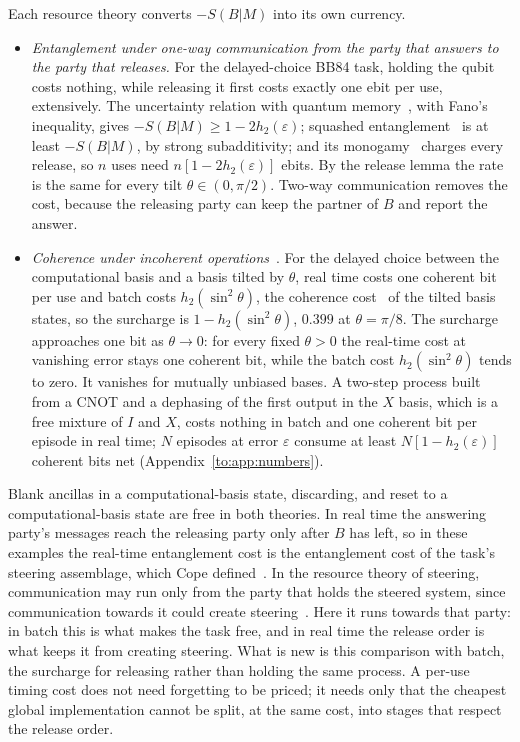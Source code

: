 Each resource theory converts $-S(B|M)$ into its own currency.
\begin{itemize}[leftmargin=*]
\item \emph{Entanglement under one-way communication from the party that answers to the party that releases.} For the delayed-choice BB84 task, holding the qubit costs nothing, while releasing it first costs exactly one ebit per use, extensively. The uncertainty relation with quantum memory~\cite{BCCRR10}, with Fano's inequality, gives $-S(B|M)\ge1-2h_2(\varepsilon)$; squashed entanglement~\cite{ChristandlWinter04} is at least $-S(B|M)$, by strong subadditivity; and its monogamy~\cite[Thm.~8]{KoashiWinter04} charges every release, so $n$ uses need $n[1-2h_2(\varepsilon)]$ ebits. By the release lemma the rate is the same for every tilt $\theta\in(0,\pi/2)$. Two-way communication removes the cost, because the releasing party can keep the partner of $B$ and report the answer.
\item \emph{Coherence under incoherent operations}~\cite{BCP14,WinterYang16}. For the delayed choice between the computational basis and a basis tilted by $\theta$, real time costs one coherent bit per use and batch costs $h_2(\sin^2\theta)$, the coherence cost~\cite{WinterYang16} of the tilted basis states, so the surcharge is $1-h_2(\sin^2\theta)$, $0.399$ at $\theta=\pi/8$. The surcharge approaches one bit as $\theta\to0$: for every fixed $\theta>0$ the real-time cost at vanishing error stays one coherent bit, while the batch cost $h_2(\sin^2\theta)$ tends to zero. It vanishes for mutually unbiased bases. A two-step process built from a CNOT and a dephasing of the first output in the $X$ basis, which is a free mixture of $I$ and $X$, costs nothing in batch and one coherent bit per episode in real time; $N$ episodes at error $\varepsilon$ consume at least $N[1-h_2(\varepsilon)]$ coherent bits net (Appendix~\ref{to:app:numbers}).
\end{itemize}
Blank ancillas in a computational-basis state, discarding, and reset to a computational-basis state are free in both theories. In real time the answering party's messages reach the releasing party only after $B$ has left, so in these examples the real-time entanglement cost is the entanglement cost of the task's steering assemblage, which Cope defined~\cite{Cope21}. In the resource theory of steering, communication may run only from the party that holds the steered system, since communication towards it could create steering~\cite{GallegoAolita15}. Here it runs towards that party: in batch this is what makes the task free, and in real time the release order is what keeps it from creating steering. What is new is this comparison with batch, the surcharge for releasing rather than holding the same process. A per-use timing cost does not need forgetting to be priced; it needs only that the cheapest global implementation cannot be split, at the same cost, into stages that respect the release order.

